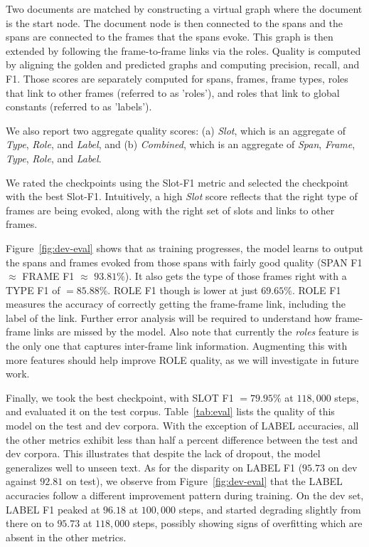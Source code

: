 \documentclass[11pt,a4paper]{article}
\begin{document}
Two documents are matched by constructing a virtual graph where the document
is the start node. The document node is then connected to the spans and the
spans are connected to the frames that the spans evoke. This graph is then
extended by following the frame-to-frame links via the roles. Quality is
computed by aligning the golden and predicted graphs and computing precision,
recall, and F1. Those scores are separately computed for spans, frames,
frame types, roles that link to other frames (referred to as 'roles'),
and roles that link to global constants (referred to as 'labels').

We also report two aggregate quality scores: (a) {\em Slot}, which is
an aggregate of {\em Type}, {\em Role}, and {\em Label}, and (b) {\em Combined},
which is an aggregate of {\em Span}, {\em Frame}, {\em Type}, {\em Role}, and
{\em Label}.

We rated the checkpoints using the Slot-F1 metric and selected the checkpoint with
the best Slot-F1. Intuitively, a high {\em Slot} score reflects that the
right type of frames are being evoked, along with the right set of slots and
links to other frames.

Figure~\ref{fig:dev-eval} shows that as training progresses,
the model learns to output the spans and frames evoked from those spans with
fairly good quality (SPAN F1 $\approx$ FRAME F1 $\approx$ $93.81\%$). It also
gets the type of those frames right with a TYPE F1 of $= 85.88\%$. ROLE F1
though is lower at just $69.65\%$. ROLE F1 measures the accuracy of correctly
getting the frame-frame link, including the label of the link. Further error
analysis will be required to understand how frame-frame links are missed by
the model. Also note that currently the {\em roles} feature is the only one
that captures inter-frame link information.
Augmenting this with more features should help improve ROLE quality, as we will
investigate in future work.

Finally, we took the best checkpoint, with SLOT F1 $= 79.95\%$ at $118,000$ steps,
and evaluated it on the test corpus.
Table~\ref{tab:eval} lists the quality of this model on the test and dev
corpora.
With the exception of LABEL accuracies, all the other metrics exhibit less than
half a percent difference between the test and dev corpora. This illustrates
that despite the lack of dropout, the model generalizes well to unseen text.
As for the disparity on LABEL F1 ($95.73$ on dev
against $92.81$ on test), we observe from Figure~\ref{fig:dev-eval}
that the LABEL accuracies follow a different improvement pattern
during training. On the dev set, LABEL F1 peaked at $96.18$ at $100,000$ steps,
and started degrading slightly from there on to $95.73$ at $118,000$ steps,
possibly showing signs of overfitting which are absent in the other metrics.
\end{document}
